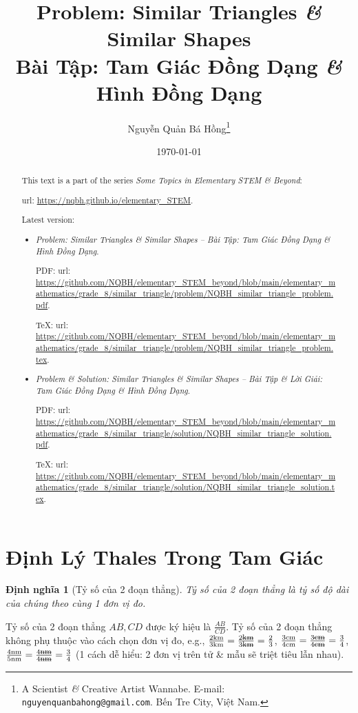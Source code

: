 \documentclass{article}
\title{Problem: Similar Triangles {\it\&} Similar Shapes\\Bài Tập: Tam Giác Đồng Dạng {\it\&} Hình Đồng Dạng}
\author{Nguyễn Quản Bá Hồng\footnote{A Scientist {\it\&} Creative Artist Wannabe. E-mail: {\tt nguyenquanbahong@gmail.com}. Bến Tre City, Việt Nam.}}
\date{\today}
\newtheorem{dinhnghia}{Định nghĩa}
\begin{document}
\maketitle
\begin{abstract}
	This text is a part of the series {\it Some Topics in Elementary STEM \& Beyond}:
	
	{\sc url}: \url{https://nqbh.github.io/elementary_STEM}.
	
	Latest version:
	\begin{itemize}
		\item {\it Problem: Similar Triangles \& Similar Shapes -- Bài Tập: Tam Giác Đồng Dạng \& Hình Đồng Dạng}.
		
		PDF: {\sc url}: \url{https://github.com/NQBH/elementary_STEM_beyond/blob/main/elementary_mathematics/grade_8/similar_triangle/problem/NQBH_similar_triangle_problem.pdf}.
		
		\TeX: {\sc url}: \url{https://github.com/NQBH/elementary_STEM_beyond/blob/main/elementary_mathematics/grade_8/similar_triangle/problem/NQBH_similar_triangle_problem.tex}.
		\item {\it Problem \& Solution: Similar Triangles \& Similar Shapes -- Bài Tập \& Lời Giải: Tam Giác Đồng Dạng \& Hình Đồng Dạng}.
		
		PDF: {\sc url}: \url{https://github.com/NQBH/elementary_STEM_beyond/blob/main/elementary_mathematics/grade_8/similar_triangle/solution/NQBH_similar_triangle_solution.pdf}.
		
		\TeX: {\sc url}: \url{https://github.com/NQBH/elementary_STEM_beyond/blob/main/elementary_mathematics/grade_8/similar_triangle/solution/NQBH_similar_triangle_solution.tex}.
	\end{itemize}
\end{abstract}
\tableofcontents


\section{Định Lý Thales Trong Tam Giác}

\begin{dinhnghia}[Tỷ số của 2 đoạn thẳng]
	\emph{Tỷ số của 2 đoạn thẳng} là tỷ số độ dài của chúng theo cùng 1 đơn vị đo.
\end{dinhnghia}
Tỷ số của 2 đoạn thẳng $AB,CD$ được ký hiệu là $\frac{AB}{CD}$. Tỷ số của 2 đoạn thẳng không phụ thuộc vào cách chọn đơn vị đo, e.g., $\frac{\rm2km}{\rm3km} = \frac{2\footnotesize\mbox{\st{km}}}{3\footnotesize\mbox{\st{km}}} = \frac{2}{3}$, $\frac{\rm3cm}{\rm4cm} = \frac{3\footnotesize\mbox{\st{cm}}}{4\footnotesize\mbox{\st{cm}}} = \frac{3}{4}$, $\frac{\rm4nm}{\rm5nm} = \frac{4\footnotesize\mbox{\st{nm}}}{4\footnotesize\mbox{\st{nm}}} = \frac{3}{4}$ (1 cách dễ hiểu: 2 đơn vị trên tử \& mẫu sẽ triệt tiêu lẫn nhau).
\end{document}
